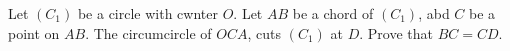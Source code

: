 Let $(C_1)$ be a circle with cwnter $O$. Let $AB$ be a chord of $(C_1)$, abd $C$ be a point on $AB$. The circumcircle of $OCA$, cuts $(C_1)$ at $D$. Prove that $BC=CD$.
